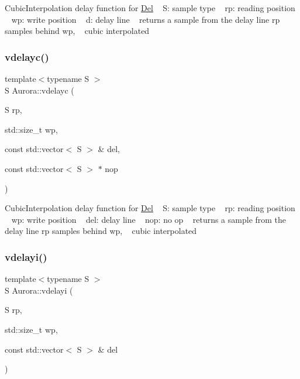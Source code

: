 Cubic\+Interpolation delay function for \hyperlink{class_aurora_1_1_del}{Del} ~\newline
S\+: sample type ~\newline
rp\+: reading position ~\newline
wp\+: write position ~\newline
d\+: delay line ~\newline
returns a sample from the delay line rp samples behind wp, ~\newline
cubic interpolated \mbox{\label{namespace_aurora_a123381990bd6cdcd199852e31a8987c6}} 
\subsubsection{\texorpdfstring{vdelayc()}{vdelayc()}\hspace{0.1cm}{\footnotesize\ttfamily [2/2]}}
{\footnotesize\ttfamily template$<$typename S $>$ \\
S Aurora\+::vdelayc (\begin{DoxyParamCaption}\item[{S}]{rp,  }\item[{std\+::size\+\_\+t}]{wp,  }\item[{const std\+::vector$<$ S $>$ \&}]{del,  }\item[{const std\+::vector$<$ S $>$ $\ast$}]{nop }\end{DoxyParamCaption})\hspace{0.3cm}{\ttfamily [inline]}}

Cubic\+Interpolation delay function for \hyperlink{class_aurora_1_1_del}{Del} ~\newline
S\+: sample type ~\newline
rp\+: reading position ~\newline
wp\+: write position ~\newline
del\+: delay line ~\newline
nop\+: no op ~\newline
returns a sample from the delay line rp samples behind wp, ~\newline
cubic interpolated \mbox{\label{namespace_aurora_a5318ddb492590ada5dc40ba80bbf655b}} 
\subsubsection{\texorpdfstring{vdelayi()}{vdelayi()}\hspace{0.1cm}{\footnotesize\ttfamily [1/2]}}
{\footnotesize\ttfamily template$<$typename S $>$ \\
S Aurora\+::vdelayi (\begin{DoxyParamCaption}\item[{S}]{rp,  }\item[{std\+::size\+\_\+t}]{wp,  }\item[{const std\+::vector$<$ S $>$ \&}]{del }\end{DoxyParamCaption})}

